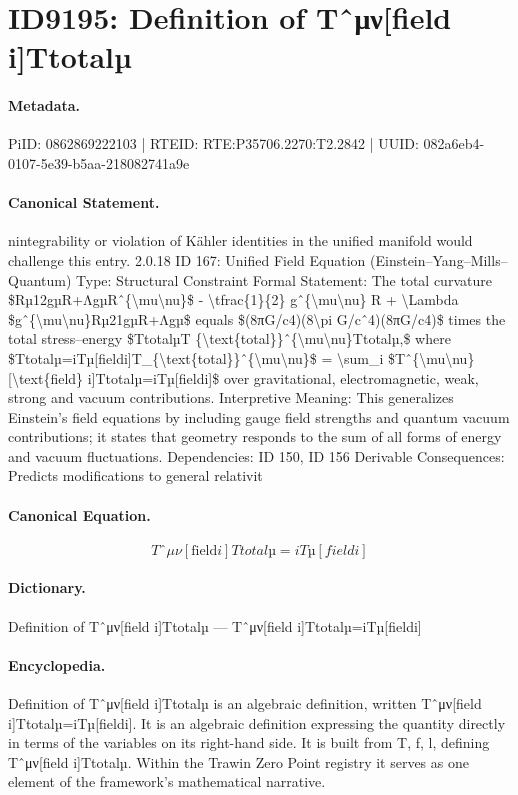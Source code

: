\section*{ID9195: Definition of Tˆμν[field i]Ttotalµ}
\paragraph{Metadata.}
PiID: 0862869222103 | RTEID: RTE:P35706.2270:T2.2842 | UUID: 082a6eb4-0107-5e39-b5aa-218082741a9e

\paragraph{Canonical Statement.}
nintegrability or violation of Kähler identities in the unified manifold would challenge this entry. 2.0.18 ID 167: Unified Field Equation (Einstein–Yang–Mills–Quantum) Type: Structural Constraint Formal Statement: The total curvature \$Rµ12gµR+ΛgµRˆ\{\textbackslash{}mu\textbackslash{}nu\}\$ - \textbackslash{}tfrac\{1\}\{2\} gˆ\{\textbackslash{}mu\textbackslash{}nu\} R + \textbackslash{}Lambda \$gˆ\{\textbackslash{}mu\textbackslash{}nu\}Rµ21gµR+Λgµ\$ equals \$(8πG/c4)(8\textbackslash{}pi G/cˆ4)(8πG/c4)\$ times the total stress–energy \$TtotalµT \{\textbackslash{}text\{total\}\}ˆ\{\textbackslash{}mu\textbackslash{}nu\}Ttotalµ,\$ where \$Ttotalµ=iTµ[fieldi]T\_\{\textbackslash{}text\{total\}\}ˆ\{\textbackslash{}mu\textbackslash{}nu\}\$ = \textbackslash{}sum\_i \$Tˆ\{\textbackslash{}mu\textbackslash{}nu\}[\textbackslash{}text\{field\} i]Ttotalµ=iTµ[fieldi]\$ over gravitational, electromagnetic, weak, strong and vacuum contributions. Interpretive Meaning: This generalizes Einstein’s field equations by including gauge field strengths and quantum vacuum contributions; it states that geometry responds to the sum of all forms of energy and vacuum fluctuations. Dependencies: ID 150, ID 156 Derivable Consequences: Predicts modifications to general relativit

\paragraph{Canonical Equation.}
\[
Tˆ{\mu\nu}[\text{field} i]Ttotalµ=iTµ[fieldi]
\]

\paragraph{Dictionary.}
Definition of Tˆμν[field i]Ttotalµ — Tˆμν[field i]Ttotalµ=iTµ[fieldi]

\paragraph{Encyclopedia.}
Definition of Tˆμν[field i]Ttotalµ is an algebraic definition, written Tˆμν[field i]Ttotalµ=iTµ[fieldi]. It is an algebraic definition expressing the quantity directly in terms of the variables on its right-hand side. It is built from T, f, l, defining Tˆμν[field i]Ttotalµ. Within the Trawin Zero Point registry it serves as one element of the framework's mathematical narrative.
